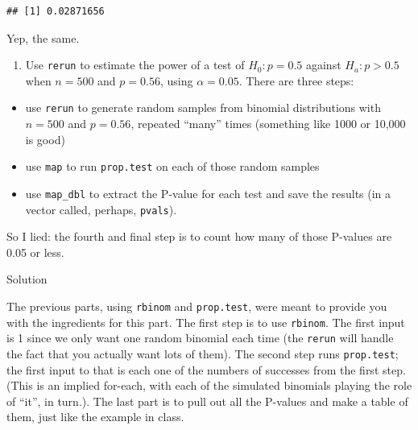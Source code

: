 \documentclass[]{tufte-book}
\newenvironment{Shaded}{}{}
\newcommand{\DataTypeTok}[1]{\textcolor[rgb]{0.56,0.13,0.00}{#1}}
\newcommand{\DecValTok}[1]{\textcolor[rgb]{0.25,0.63,0.44}{#1}}
\newcommand{\FloatTok}[1]{\textcolor[rgb]{0.25,0.63,0.44}{#1}}
\newcommand{\KeywordTok}[1]{\textcolor[rgb]{0.00,0.44,0.13}{\textbf{#1}}}
\newcommand{\NormalTok}[1]{#1}
\newcommand{\OperatorTok}[1]{\textcolor[rgb]{0.40,0.40,0.40}{#1}}
\newcommand{\StringTok}[1]{\textcolor[rgb]{0.25,0.44,0.63}{#1}}
\providecommand{\tightlist}{%
  \setlength{\itemsep}{0pt}\setlength{\parskip}{0pt}}
\theoremstyle{definition}
\theoremstyle{definition}
\theoremstyle{definition}
\theoremstyle{remark}
\begin{document}
\begin{verbatim}
## [1] 0.02871656
\end{verbatim}

Yep, the same.

\begin{enumerate}
\def\labelenumi{(\alph{enumi})}
\setcounter{enumi}{3}
\tightlist
\item
  Use \texttt{rerun} to estimate the power of a test of \(H_0: p=0.5\)
  against \(H_a: p>0.5\) when \(n=500\) and \(p=0.56\), using
  \(\alpha=0.05\). There are three steps:
\end{enumerate}

\begin{itemize}
\item
  use \texttt{rerun} to generate random samples from binomial
  distributions with \(n=500\) and \(p=0.56\), repeated ``many'' times
  (something like 1000 or 10,000 is good)
\item
  use \texttt{map} to run \texttt{prop.test} on each of those random
  samples
\item
  use \texttt{map\_dbl} to extract the P-value for each test and save
  the results (in a vector called, perhaps, \texttt{pvals}).
\end{itemize}

So I lied: the fourth and final step is to count how many of those
P-values are 0.05 or less.

Solution

The previous parts, using \texttt{rbinom} and \texttt{prop.test}, were
meant to provide you with the ingredients for this part. The first step
is to use \texttt{rbinom}. The first input is 1 since we only want one
random binomial each time (the \texttt{rerun} will handle the fact that
you actually want lots of them). The second step runs
\texttt{prop.test}; the first input to that is each one of the numbers
of successes from the first step. (This is an implied for-each, with
each of the simulated binomials playing the role of ``it'', in turn.).
The last part is to pull out all the P-values and make a table of them,
just like the example in class.

\begin{Shaded}
\end{Shaded}
\end{document}
